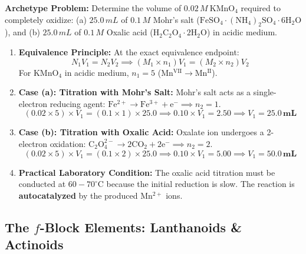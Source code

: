 \documentclass[10pt,twoside,openright]{book}
\begin{document}
\begin{usecasebox}
\textbf{Archetype Problem:} Determine the volume of $0.02\,\si{M}\ \mathrm{KMnO_4}$ required to completely oxidize:
(a) $25.0\,\si{mL}$ of $0.1\,\si{M}$ Mohr's salt ($\mathrm{FeSO_4}\cdot\mathrm{(NH_4)_2SO_4}\cdot 6\mathrm{H_2O}$), and
(b) $25.0\,\si{mL}$ of $0.1\,\si{M}$ Oxalic acid ($\mathrm{H_2C_2O_4}\cdot 2\mathrm{H_2O}$) in acidic medium.
\begin{enumerate}
  \item \textbf{Equivalence Principle:} At the exact equivalence endpoint:
  \begin{equation*}
    N_1 V_1 = N_2 V_2 \implies (M_1 \times n_1) V_1 = (M_2 \times n_2) V_2
  \end{equation*}
  For $\mathrm{KMnO_4}$ in acidic medium, $n_1 = 5$ ($\mathrm{Mn^{VII} \to Mn^{II}}$).
  \item \textbf{Case (a): Titration with Mohr's Salt:}
  Mohr's salt acts as a single-electron reducing agent: $\mathrm{Fe^{2+} \to Fe^{3+} + e^-} \implies n_2 = 1$.
  \begin{equation*}
    (0.02 \times 5) \times V_1 = (0.1 \times 1) \times 25.0 \implies 0.10 \times V_1 = 2.50 \implies V_1 = \mathbf{25.0\,\si{mL}}
  \end{equation*}
  \item \textbf{Case (b): Titration with Oxalic Acid:}
  Oxalate ion undergoes a 2-electron oxidation: $\mathrm{C_2O_4^{2-} \to 2CO_2 + 2e^-} \implies n_2 = 2$.
  \begin{equation*}
    (0.02 \times 5) \times V_1 = (0.1 \times 2) \times 25.0 \implies 0.10 \times V_1 = 5.00 \implies V_1 = \mathbf{50.0\,\si{mL}}
  \end{equation*}
  \item \textbf{Practical Laboratory Condition:} The oxalic acid titration must be conducted at $60-70^\circ\text{C}$ because the initial reduction is slow. The reaction is \textbf{autocatalyzed} by the produced $\mathrm{Mn^{2+}}$ ions.
\end{enumerate}
\end{usecasebox}

\subsection{The $f$-Block Elements: Lanthanoids \& Actinoids}
\end{document}
